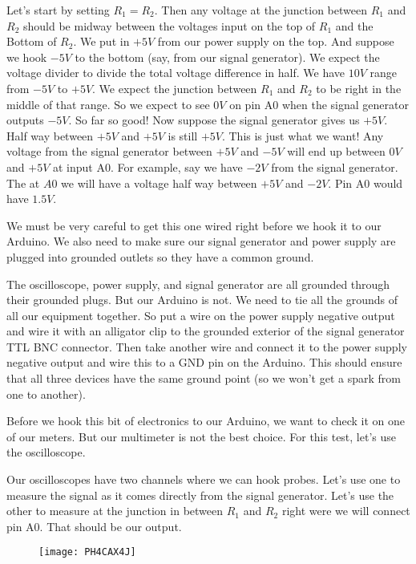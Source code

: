 Let's start by setting $R_{1}=R_{2}.$ Then any voltage at the junction between $R_{1}$ and $R_{2}$ should be midway between the voltages input on the top of $R_{1}$ and the Bottom of $R_{2}.$ We put in $+5\unit{V}$ from our power supply on the top. And suppose we hook $-5\unit{V}$ to the bottom (say, from our signal generator). We expect the voltage divider to divide the total voltage difference in half. We have $10\unit{V}$ range from $-5\unit{V}$ to $+5\unit{V}$. We expect the junction between $R_{1}$ and $R_{2}$ to be right in the middle of that range. So we expect to see $0\unit{V}$ on pin A0 when the signal generator outputs $-5\unit{V}.$ So far so good! Now suppose the signal generator gives us $+5\unit{V}.$ Half way between $+5\unit{V}$ and $+5\unit{V}$ is still $+5\unit{V}$. This is just what we want! Any voltage from the signal generator between $+5\unit{V}$ and $-5\unit{V}$ will end up between $0\unit{V}$ and $+5\unit{V}$ at input A0. For example, say we have $-2\unit{V}$ from the signal generator. The at $A0$ we will have a voltage half way between $+5\unit{V}$ and $-2\unit{V}.$ Pin A0 would have $1.5\unit{V}.$

We must be very careful to get this one wired right before we hook it to our Arduino. We also need to make sure our signal generator and power supply are plugged into grounded outlets so they have a common ground.

The oscilloscope, power supply, and signal generator are all grounded
through their grounded plugs. But our Arduino is not. We need to tie all the grounds of all our equipment together. So put a wire on the power supply negative output and wire it with an alligator clip to the grounded exterior of the signal generator TTL BNC connector. Then take another wire and connect it to the power supply negative output and wire this to a GND pin on the Arduino. This should ensure that all three devices have the same ground point (so we won't get a spark from one to another).

Before we hook this bit of electronics to our Arduino, we want to check it on one of our meters. But our multimeter is not the best choice. For this test, let's use the oscilloscope.

Our oscilloscopes have two channels where we can hook probes. Let's use one to measure the signal as it comes directly from the signal generator. Let's use the other to measure at the junction in between $R_{1}$ and $R_{2}$ right were we will connect pin A0. That should be our output. \begin{figure}[h!]
	\centering
	\texttt{[image: PH4CAX4J]}
\end{figure}

